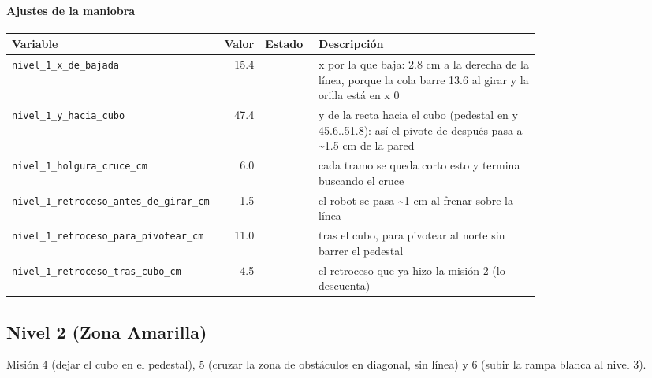\paragraph{Ajustes de la maniobra}
\begin{longtable}{@{}p{0.36\linewidth}rlp{0.42\linewidth}@{}}\toprule
\textbf{Variable} & \textbf{Valor} & \textbf{Estado} & \textbf{Descripci\'on} \\\midrule\endhead
\texttt{nivel\_\allowbreak{}1\_\allowbreak{}x\_\allowbreak{}de\_\allowbreak{}bajada} & 15.4 &  & x por la que baja: 2.8 cm a la derecha de la línea, porque la cola barre 13.6 al girar y la orilla está en x 0 \\
\texttt{nivel\_\allowbreak{}1\_\allowbreak{}y\_\allowbreak{}hacia\_\allowbreak{}cubo} & 47.4 &  & y de la recta hacia el cubo (pedestal en y 45.6..51.8): así el pivote de después pasa a \textasciitilde{}1.5 cm de la pared \\
\texttt{nivel\_\allowbreak{}1\_\allowbreak{}holgura\_\allowbreak{}cruce\_\allowbreak{}cm} & 6.0 &  & cada tramo se queda corto esto y termina buscando el cruce \\
\texttt{nivel\_\allowbreak{}1\_\allowbreak{}retroceso\_\allowbreak{}antes\_\allowbreak{}de\_\allowbreak{}girar\_\allowbreak{}cm} & 1.5 &  & el robot se pasa \textasciitilde{}1 cm al frenar sobre la línea \\
\texttt{nivel\_\allowbreak{}1\_\allowbreak{}retroceso\_\allowbreak{}para\_\allowbreak{}pivotear\_\allowbreak{}cm} & 11.0 &  & tras el cubo, para pivotear al norte sin barrer el pedestal \\
\texttt{nivel\_\allowbreak{}1\_\allowbreak{}retroceso\_\allowbreak{}tras\_\allowbreak{}cubo\_\allowbreak{}cm} & 4.5 &  & el retroceso que ya hizo la misión 2 (lo descuenta) \\
\bottomrule\end{longtable}
\subsection{Nivel 2 (Zona Amarilla)}
Misión 4 (dejar el cubo en el pedestal), 5 (cruzar la zona de obstáculos en diagonal, sin línea) y 6 (subir la rampa blanca al nivel 3).

